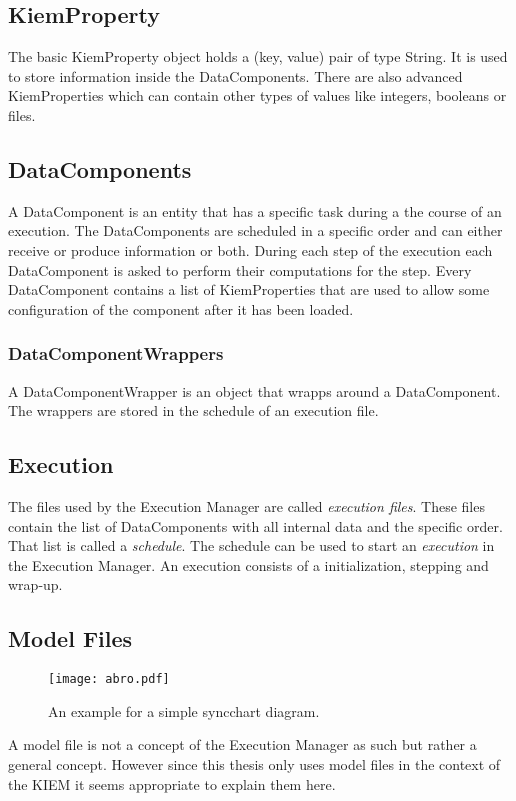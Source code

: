 \subsection{KiemProperty}
\label{section:IntroKiemProperty}
The basic KiemProperty object holds a (key, value) pair of type String. It is used to store information
inside the DataComponents. There are also advanced KiemProperties which can contain other types of values
like integers, booleans or files.

\subsection{DataComponents}
\label{section:IntroDataComponent}
A DataComponent is an entity that has a specific task during a the course of an execution. The
DataComponents are scheduled in a specific order and can either receive or produce information or both. 
During each step of the execution each DataComponent is asked to perform their computations for the step. Every
DataComponent contains a list of KiemProperties that are used to allow some configuration of the component
after it has been loaded.

\subsubsection{DataComponentWrappers}
\label{section:IntroDataComponentWrapper}
A DataComponentWrapper is an object that wrapps around a DataComponent. The wrappers are stored in the schedule
of an execution file.

\subsection{Execution}
\label{section:IntroExecution}
The files used by the Execution Manager are called \textit{execution files}. These files contain 
the list of DataComponents with all internal data and the specific order. That list is called a
\textit{schedule}. The schedule can be used to start an \textit{execution} in the Execution Manager.
An execution consists of a initialization, stepping and wrap-up.

\subsection{Model Files}
\label{section:IntroModelFile}
\begin{figure}
  \centering
  \texttt{[image: abro.pdf]}
  \caption[An example for a simple syncchart diagram.]%
  {An example for a simple syncchart diagram.\protect}
  \label{fig:abro}
\end{figure}
A model file is not a concept of the Execution Manager as such but rather a general concept. However
since this thesis only uses model files in the context of the \ac{KIEM} it seems appropriate to explain
them here.

